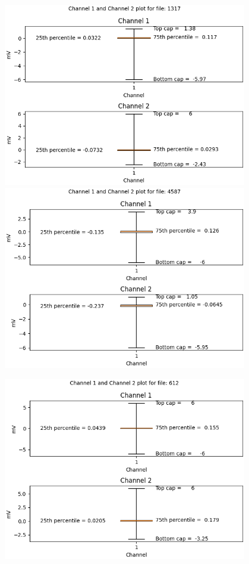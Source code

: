 \begin{figure}[ht!]
\centering
    \begin{minipage}{.5\textwidth}
      \centering
        \includegraphics[width=1.0\linewidth, height=8cm]{BachelorMasterThesis/DataExploration/Figures/sinus/box_plot/1317_box.png}
            \label{fig:sinus_box_1}
        \includegraphics[width=1.0\linewidth, height=8cm]{BachelorMasterThesis/DataExploration/Figures/sinus/box_plot/4587_box.png}
            \label{fig:sinus_box_2}
    \end{minipage}%
    \begin{minipage}{.5\textwidth}
      \centering
        \includegraphics[width=1.0\linewidth, height=8cm]{BachelorMasterThesis/DataExploration/Figures/atrial_fibrillation/box_plot/612_box.png}

\end{minipage}
\end{figure}
